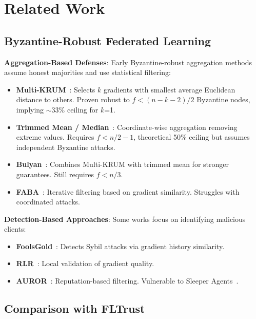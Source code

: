 \section{Related Work}
\label{sec:related}

\subsection{Byzantine-Robust Federated Learning}

\textbf{Aggregation-Based Defenses}: Early Byzantine-robust aggregation methods assume honest majorities and use statistical filtering:

\begin{itemize}
    \item \textbf{Multi-KRUM}~\cite{blanchard2017machine}: Selects $k$ gradients with smallest average Euclidean distance to others. Proven robust to $f < (n-k-2)/2$ Byzantine nodes, implying $\sim$33\% ceiling for $k$=1.

    \item \textbf{Trimmed Mean / Median}~\cite{yin2018byzantine}: Coordinate-wise aggregation removing extreme values. Requires $f < n/2 - 1$, theoretical 50\% ceiling but assumes independent Byzantine attacks.

    \item \textbf{Bulyan}~\cite{mhamdi2018machine}: Combines Multi-KRUM with trimmed mean for stronger guarantees. Still requires $f < n/3$.

    \item \textbf{FABA}~\cite{munoz2019byzantine}: Iterative filtering based on gradient similarity. Struggles with coordinated attacks.
\end{itemize}

\textbf{Detection-Based Approaches}: Some works focus on identifying malicious clients:

\begin{itemize}
    \item \textbf{FoolsGold}~\cite{fung2018mitigating}: Detects Sybil attacks via gradient history similarity.
    \item \textbf{RLR}~\cite{fung2020limitations}: Local validation of gradient quality.
    \item \textbf{AUROR}~\cite{shen2016auror}: Reputation-based filtering. Vulnerable to Sleeper Agents~\cite{bagdasaryan2020backdoor}.
\end{itemize}

\subsection{Comparison with FLTrust}

